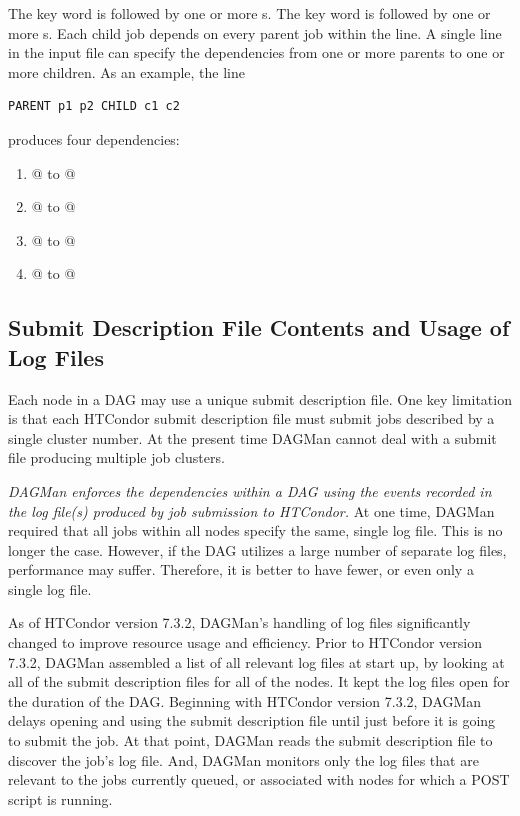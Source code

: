 \begin{itemize}
   

The  key word is followed by one or more
s.
The  key word is followed by one or more
s.
Each child job depends on every parent job within the line.
A single line in the input file can specify the dependencies from one or more
parents to one or more children.
As an example, the line
\begin{verbatim}
PARENT p1 p2 CHILD c1 c2
\end{verbatim}
produces four dependencies:
\begin{enumerate}
\item{@ to @}
\item{@ to @}
\item{@ to @}
\item{@ to @}
\end{enumerate}

\end{itemize}

\subsection{Submit Description File Contents and Usage of Log Files}

Each node in a DAG may use a unique submit description file.
One key limitation is that
each HTCondor submit description file must submit jobs
described by a single cluster number.
At the present time DAGMan cannot deal with a submit file producing
multiple job clusters.

\emph{DAGMan enforces the dependencies within a DAG
using the events recorded in the
log file(s) produced by job submission to HTCondor.}
At one time, DAGMan required that all jobs within all nodes
specify the same, single log file.
This is no longer the case.
However, if the DAG utilizes a large number of
separate log files, performance may suffer.
Therefore, it is better to have
fewer, or even only a single log file.

As of HTCondor version 7.3.2, DAGMan's handling of log files
significantly changed to improve resource usage and efficiency.  
Prior to HTCondor version 7.3.2, 
DAGMan assembled a list of all relevant log files at start up, 
by looking at all of the submit description files for all of the nodes.
It kept the log files open for the duration of the DAG.
Beginning with HTCondor version 7.3.2, DAGMan delays opening and using 
the submit description file until just before it is going to submit the job.
At that point, DAGMan reads the submit description file to discover 
the job's log file.
And, DAGMan monitors only the log files that are relevant
to the jobs currently queued, 
or associated with nodes for which a POST script is running.

